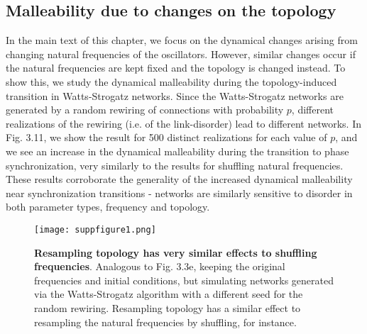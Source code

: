 \subsection*{Malleability due to changes on the topology}
In the main text of this chapter, we focus on the dynamical changes arising from changing natural frequencies of the oscillators. However, similar changes occur if the natural frequencies are kept fixed and the topology is changed instead. To show this, we study the dynamical malleability during the topology-induced transition in Watts-Strogatz networks. Since the Watts-Strogatz networks are generated by a random rewiring of connections with probability $p$, different realizations of the rewiring (i.e. of the link-disorder) lead to different networks. In Fig. 3.11, we show the result for 500 distinct realizations for each value of $p$, and we see an increase in the dynamical malleability during the transition to phase synchronization, very similarly to the results for shuffling natural frequencies. These results corroborate the generality of the increased dynamical malleability near synchronization transitions - networks are similarly sensitive to disorder in both parameter types, frequency and topology.

\begin{figure}[htb]
    \centering
    \texttt{[image: suppfigure1.png]}
    \caption{\textbf{Resampling topology has very similar effects to shuffling frequencies}. Analogous to Fig. 3.3e, keeping the original frequencies and initial conditions, but simulating networks generated via the Watts-Strogatz algorithm with a different seed for the random rewiring. Resampling topology has a similar effect to resampling the natural frequencies by shuffling, for instance.}
    \label{sup:fig:transitionresamplingtop}
\end{figure}


